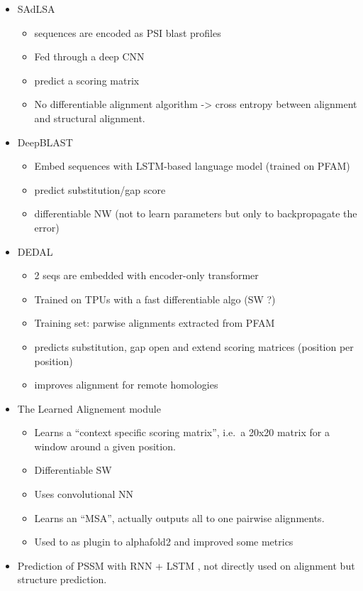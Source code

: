 \documentclass[
  11pt,
  twoside,
  BCOR=10mm,
  listof=totoc]{scrbook}
\begin{document}
\begin{itemize}
\item
  SAdLSA \autocite{gaoNovelSequenceAlignment2021}

  \begin{itemize}
  \item
    sequences are encoded as PSI blast profiles
  \item
    Fed through a deep CNN
  \item
    predict a scoring matrix
  \item
    No differentiable alignment algorithm -\textgreater{} cross entropy between alignment and structural alignment.
  \end{itemize}
\item
  DeepBLAST \autocite{mortonProteinStructuralAlignments2020}

  \begin{itemize}
  \item
    Embed sequences with LSTM-based language model (trained on PFAM)
  \item
    predict substitution/gap score
  \item
    differentiable NW (not to learn parameters but only to backpropagate the error)
  \end{itemize}
\item
  DEDAL \autocite{llinares-lopezDeepEmbeddingAlignment2022}

  \begin{itemize}
  \item
    2 seqs are embedded with encoder-only transformer
  \item
    Trained on TPUs with a fast differentiable algo (SW ?)
  \item
    Training set: parwise alignments extracted from PFAM
  \item
    predicts substitution, gap open and extend scoring matrices (position per position)
  \item
    improves alignment for remote homologies
  \end{itemize}
\item
  The Learned Alignement module \autocite{pettiEndtoendLearningMultiple2022}

  \begin{itemize}
  \item
    Learns a ``context specific scoring matrix'', i.e.~a 20x20 matrix for a window around a given position.
  \item
    Differentiable SW
  \item
    Uses convolutional NN
  \item
    Learns an ``MSA'', actually outputs all to one pairwise alignments.
  \item
    Used to as plugin to alphafold2 and improved some metrics
  \end{itemize}
\item
  Prediction of PSSM with RNN + LSTM \autocite{guoComprehensiveStudyEnhancing2021} , not directly used on alignment but structure prediction.
\end{itemize}
\end{document}
